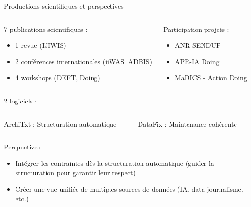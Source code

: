 \documentclass[english,french,table,aspectratio=43]{beamer}
\renewcommand{\_}{\ifincsname_\else\legacyunderscore\fi}
\begin{document}
\begin{frame}{Productions scientifiques et perspectives}
    \begin{columns}
        \begin{column}{.5\linewidth}
            7 publications scientifiques :
            \begin{itemize}
                \item 1 revue (IJIWIS)
                \item 2 conférences internationales (iiWAS, ADBIS)
                \item 4 workshops (DEFT, Doing)
            \end{itemize}
        \end{column}
        \begin{column}{.5\linewidth}
            Participation projets :
            \begin{itemize}
                \item ANR SENDUP
                \item APR-IA Doing
                \item MaDICS - Action Doing
            \end{itemize}
        \end{column}
    \end{columns}
    2 logiciels :
    \begin{itemize}
        \begin{columns}
            \begin{column}{.5\linewidth}
                \item ArchiTxt : Structuration automatique
            \end{column}
            \begin{column}{.5\linewidth}
                \item DataFix : Maintenance cohérente
            \end{column}
        \end{columns}
    \end{itemize}
    \vfill
    \begin{block}{Perspectives}
        \begin{itemize} 
            \item Intégrer les contraintes dès la structuration automatique (guider la structuration pour garantir leur respect)
            \vfill
            \item Créer une vue unifiée de multiples sources de données (IA, data journalisme, etc.)
        \end{itemize}
    \end{block}
\end{frame}

\frame{\titlepage}

%     
%     
\end{document}
